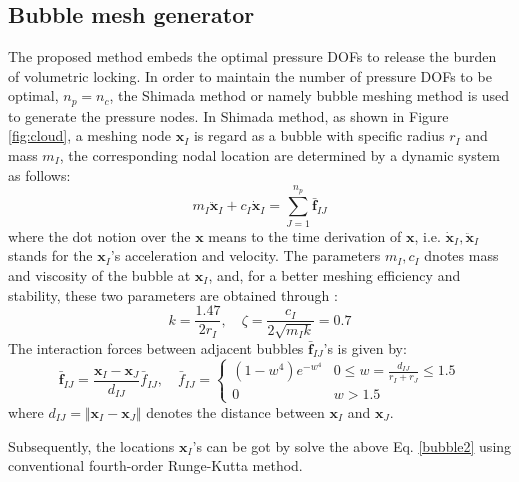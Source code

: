 \subsection{Bubble mesh generator}
The proposed method embeds the optimal pressure DOFs to release the burden of volumetric locking. In order to maintain the number of pressure DOFs to be optimal, $n_p=n_c$, the Shimada method or namely bubble meshing method is used to generate the pressure nodes. 
In Shimada method, as shown in Figure \ref{fig:cloud}, a meshing node $\boldsymbol x_I$ is regard as a bubble with specific radius $r_I$ and mass $m_I$, the corresponding nodal location are determined by a dynamic system as follows:
\begin{equation} \label{bubble1}
    m_I \ddot{\boldsymbol x}_{I} + c_I \dot{\boldsymbol x}_I = \sum_{J=1}^{n_p} \bar{\boldsymbol f}_{IJ}
\end{equation}
where the dot notion over the $\boldsymbol x$ means to the time derivation of $\boldsymbol x$, i.e. $\dot{\boldsymbol x}_I, \ddot{\boldsymbol x}_I$ stands for the $\boldsymbol x_I$'s acceleration and velocity. 
The parameters $m_I, c_I$ dnotes mass and viscosity of the bubble at $\boldsymbol x_I$, and, for a better meshing efficiency and stability, these two parameters are obtained through \cite{dinh2017}:
\begin{equation} \label{bubble2}
    k = \frac{1.47}{2r_I}, \quad \zeta = \frac{c_I}{2\sqrt{m_I k}} = 0.7
\end{equation}
The interaction forces between adjacent bubbles $\bar{\boldsymbol f}_{IJ}$'s is given by:
\begin{equation}
\bar{\boldsymbol f}_{IJ} = \frac{\boldsymbol x_I - \boldsymbol x_J}{d_{IJ}} \bar f_{IJ}, \quad
\bar f_{IJ} =
\begin{cases}
    (1-w^4) e^{-w^4} & 0\le w= \frac{d_{IJ}}{r_I+r_J} \le 1.5 \\
    0 & w>1.5
\end{cases}
\end{equation}
where $d_{IJ} = \Vert \boldsymbol x_I - \boldsymbol x_J \Vert$ denotes the distance between $\boldsymbol x_I$ and $\boldsymbol x_J$.

Subsequently, the locations $\boldsymbol x_I$'s can be got by solve the above Eq. \eqref{bubble2} using conventional fourth-order Runge-Kutta method.

